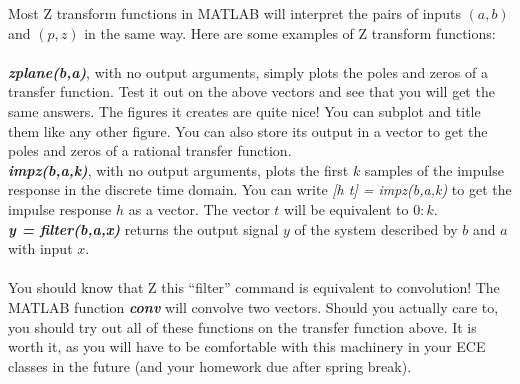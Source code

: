 \documentclass{article}
\begin{document}
\noindent  Most Z transform functions in MATLAB will interpret the pairs of inputs $(a,b)$ and $(p,z)$ in the same way. 
Here are some examples of Z transform functions: \\ \\
\noindent \textbf{\textit{zplane(b,a)}}, with no output arguments, simply plots the poles and zeros of a transfer function. Test it out on 
the above vectors and see that you will get the same answers. The figures it creates are quite nice! You can subplot and title 
them like any other figure. You can also store its output in a vector to get the poles and zeros of a rational transfer function. \\ 
\textbf{\textit{impz(b,a,k)}}, with no output arguments, plots the first $k$ samples of the impulse response in the discrete time domain. 
You can write \textit{[h t] = impz(b,a,k)} to get the impulse response $h$ as a vector. The vector $t$ will be equivalent to $0:k$. \\
\textbf{\textit{y = filter(b,a,x)}} returns the output signal $y$ of the system described by $b$ and $a$ with input $x$. \\ \\
\noindent You should know that Z this ``filter'' command is equivalent to convolution! The MATLAB function \textbf{\textit{conv}} will convolve 
two vectors. Should you actually care to, you should try out all of these functions on the transfer function above. It is worth it, 
as you will have to be comfortable with this machinery in your ECE classes in the future (and your homework due after spring break).
\end{document}
